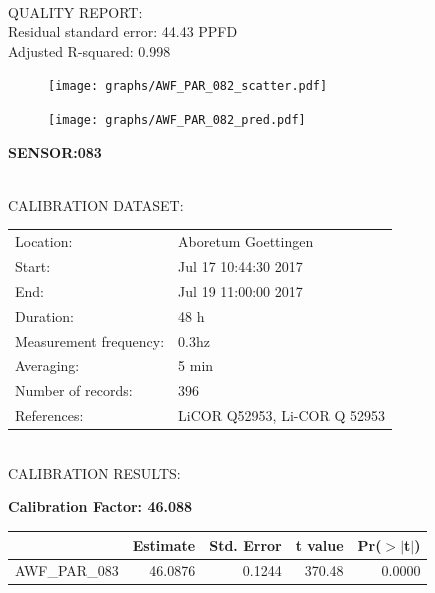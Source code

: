 \documentclass[oneside]{report}
\begin{document}
\hrulefill\\
QUALITY REPORT:\\
Residual standard error: 44.43 PPFD\\
Adjusted R-squared: 0.998



\begin{figure}[H]
  \centering
  \texttt{[image: graphs/AWF\_PAR\_082\_scatter.pdf]}
\end{figure}




\begin{figure}[H]
  \centering
  \texttt{[image: graphs/AWF\_PAR\_082\_pred.pdf]}
\end{figure}

\pagebreak


\begin{center}
\large{\textbf{SENSOR:083}}\\
\end{center}

\hrulefill\\
CALIBRATION DATASET:\\
\begin{table}[h!]
  \centering
  \label{tab:table1}
  \begin{tabular}{ll}
    Location: & Aboretum Goettingen\\ 
    
    
    Start:  & Jul 17 10:44:30 2017 \\
    End:   & Jul 19 11:00:00 2017\\ 
    Duration: & 48 h\\
    Measurement frequency: & 0.3hz\\
    Averaging:  &5 min\\
    Number of records: & 396 \\
    References: & LiCOR Q52953, Li-COR Q 52953 \\
  \end{tabular}
\end{table}

\hrulefill\\
CALIBRATION RESULTS:\\


\begin{center}
\textbf{\large{Calibration Factor: 46.088}}\\
\end{center}
\begin{table}[ht]
\centering
\begin{tabular}{rrrrr}
  \hline
 & Estimate & Std. Error & t value & Pr($>$$|$t$|$) \\ 
  \hline
AWF\_PAR\_083 & 46.0876 & 0.1244 & 370.48 & 0.0000 \\ 
   \hline
\end{tabular}
\end{table}
\end{document}
